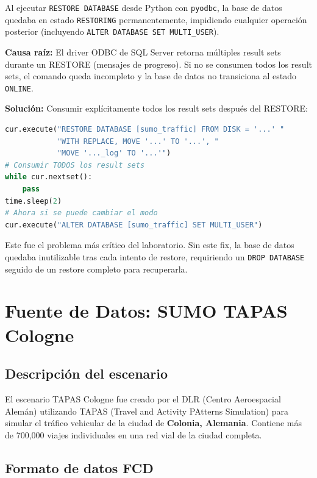 \documentclass[12pt,a4paper]{article}
\begin{document}
Al ejecutar \texttt{RESTORE DATABASE} desde Python con \texttt{pyodbc}, la base de datos quedaba en estado \texttt{RESTORING} permanentemente, impidiendo cualquier operaci\'on posterior (incluyendo \texttt{ALTER DATABASE SET MULTI\_USER}).

\textbf{Causa ra\'iz:} El driver ODBC de SQL Server retorna m\'ultiples result sets durante un RESTORE (mensajes de progreso). Si no se consumen todos los result sets, el comando queda incompleto y la base de datos no transiciona al estado \texttt{ONLINE}.

\textbf{Soluci\'on:} Consumir expl\'icitamente todos los result sets despu\'es del RESTORE:

\begin{lstlisting}[language=Python,caption={Fix para RESTORE con pyodbc}]
cur.execute("RESTORE DATABASE [sumo_traffic] FROM DISK = '...' "
            "WITH REPLACE, MOVE '...' TO '...', "
            "MOVE '..._log' TO '...'")
# Consumir TODOS los result sets
while cur.nextset():
    pass
time.sleep(2)
# Ahora si se puede cambiar el modo
cur.execute("ALTER DATABASE [sumo_traffic] SET MULTI_USER")
\end{lstlisting}

Este fue el problema m\'as cr\'itico del laboratorio. Sin este fix, la base de datos quedaba inutilizable tras cada intento de restore, requiriendo un \texttt{DROP DATABASE} seguido de un restore completo para recuperarla.

\section{Fuente de Datos: SUMO TAPAS Cologne}

\subsection{Descripci\'on del escenario}

El escenario TAPAS Cologne fue creado por el DLR (Centro Aeroespacial Alem\'an) utilizando TAPAS (Travel and Activity PAtterns Simulation) para simular el tr\'afico vehicular de la ciudad de \textbf{Colonia, Alemania}. Contiene m\'as de 700,000 viajes individuales en una red vial de la ciudad completa.

\subsection{Formato de datos FCD}
\end{document}
